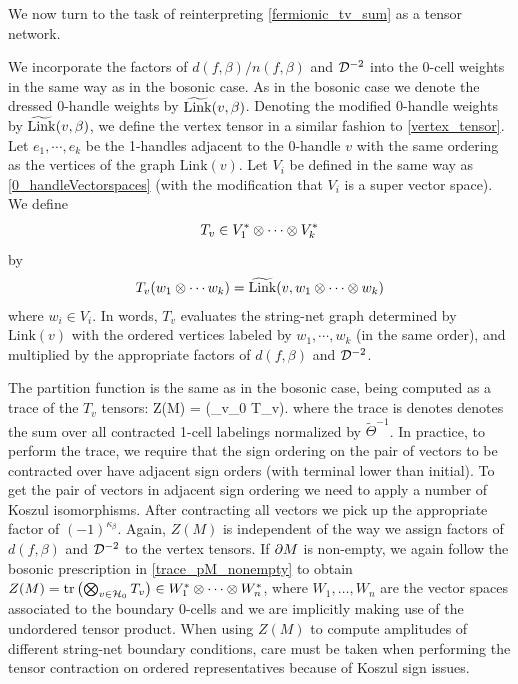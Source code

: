 We now turn to the task of reinterpreting \eqref{fermionic_tv_sum} as a tensor network. %

\medskip

We incorporate the factors of $d(f, \beta)/n(f,\beta)$ and $\mathcal{D}^{-2}$ into the 0-cell 
weights 
in the same way as in the bosonic case. 
As in the bosonic case we denote the dressed 0-handle weights by $\widetilde{\rm Link}(v,\beta)$.
Denoting the modified 0-handle weights by $\widetilde{\rm Link}(v,\beta)$, 
we define the vertex tensor in a similar fashion to \eqref{vertex_tensor}. 
Let $e_1, \cdots, e_k$ be the 1-handles adjacent to the 0-handle $v$ with the same ordering as the vertices of the graph $\text{Link}(v)$.
Let $V_i$ be defined in the same way as \eqref{0_handleVectorspaces} (with the modification that $V_i$ is a super vector space).
We define 
\begin{align} 
T_v  \in V_1^* \otimes \cdots \otimes V_k^*
\end{align}
by 
\begin{align}
T_v(w_1 \otimes \cdots w_k) = \widetilde{\text{Link}}(v, w_1 \otimes \cdots \otimes w_k)
\end{align} 
where $w_i \in V_i$.
In words, $T_v$ evaluates the string-net graph determined by $\text{Link}(v)$ with the ordered vertices labeled by $w_1, \cdots, w_k$ (in the same order), and multiplied by the appropriate factors of $d(f,\beta)$ and $\mathcal{D}^{-2}$.

The partition function 
is the same as in the bosonic case, being computed as a trace of the $T_v$ tensors:
\be \label{fermion_Z_as_tr} Z(M) = \tr \left(\bigotimes_{v\in \mch_0} T_v\right).\ee
where the trace is denotes denotes the sum over all contracted 1-cell labelings normalized by $\widetilde{\Theta}^{-1}$.
In practice, to perform the trace, we require that the sign ordering on the pair of vectors to be contracted over have adjacent sign orders (with terminal lower than initial). 
To get the pair of vectors in adjacent sign ordering we need to apply a number of Koszul isomorphisms. 
After contracting all vectors we pick up the appropriate factor of $(-1)^{\kappa_\beta}$. 
Again, $Z(M)$
is independent of the way we assign factors of $d(f,\beta)$ and $\mathcal{D}^{-2}$ to the 
vertex tensors. 
If $\partial M$ is non-empty, we again follow the bosonic prescription in \eqref{trace_pM_nonempty} 
to obtain $Z(M) = \text{tr} \left( \bigotimes_{v\in \mathcal{H}_0} T_v \right) \in W_1^*\otimes\cdots\otimes W_n^*$, where 
$W_1, \ldots, W_n$ are the vector spaces associated to the boundary 0-cells and we 
are implicitly making use of the undordered tensor product. When using $Z(M)$ to compute 
amplitudes of different string-net boundary conditions, care must be taken when performing the 
tensor contraction on ordered representatives because of Koszul sign issues. 

